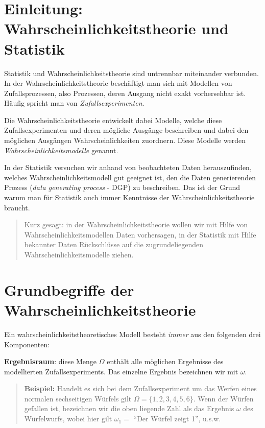 \documentclass[]{book}
\begin{document}
\section{Einleitung: Wahrscheinlichkeitstheorie und
Statistik}\label{einleitung-wahrscheinlichkeitstheorie-und-statistik}

Statistik und Wahrscheinlichkeitstheorie sind untrennbar miteinander
verbunden. In der Wahrscheinlichkeitstheorie beschäftigt man sich mit
Modellen von Zufallsprozessen, also Prozessen, deren Ausgang nicht exakt
vorhersehbar ist. Häufig spricht man von \emph{Zufallsexperimenten}.

Die Wahrscheinlichkeitstheorie entwickelt dabei Modelle, welche diese
Zufallsexperimenten und deren mögliche Ausgänge beschreiben und dabei
den möglichen Ausgängen Wahrscheinlichkeiten zuordnern. Diese Modelle
werden \emph{Wahrscheinlichkeitsmodelle} genannt.

In der Statistik versuchen wir anhand von beobachteten Daten
herauszufinden, welches Wahrscheinlichkeitsmodell gut geeignet ist, den
die Daten generierenden Prozess (\emph{data generating process} - DGP)
zu beschreiben. Das ist der Grund warum man für Statistik auch immer
Kenntnisse der Wahrscheinlichkeitstheorie braucht.

\begin{quote}
Kurz gesagt: in der Wahrscheinlichkeitstheorie wollen wir mit Hilfe von
Wahrscheinlichkeitsmodellen Daten vorhersagen, in der Statistik mit
Hilfe bekannter Daten Rückschlüsse auf die zugrundeliegenden
Wahrscheinlichkeitsmodelle ziehen.
\end{quote}

\section{Grundbegriffe der
Wahrscheinlichkeitstheorie}\label{grundbegriffe-der-wahrscheinlichkeitstheorie}

Ein wahrscheinlichkeitstheoretisches Modell besteht \emph{immer} aus den
folgenden drei Komponenten:

\textbf{Ergebnisraum}: diese Menge \(\Omega\) enthält alle möglichen
Ergebnisse des modellierten Zufallsexperiments. Das einzelne Ergebnis
bezeichnen wir mit \(\omega\).

\begin{quote}
\textbf{Beispiel:} Handelt es sich bei dem Zufallsexperiment um das
Werfen eines normalen sechseitigen Würfels gilt
\(\Omega=\{1,2,3,4,5,6\}\). Wenn der Würfen gefallen ist, bezeichnen wir
die oben liegende Zahl als das Ergebnis \(\omega\) des Würfelwurfs,
wobei hier gilt \(\omega_1=\) ``Der Würfel zeigt 1'', u.s.w.
\end{quote}
\end{document}
